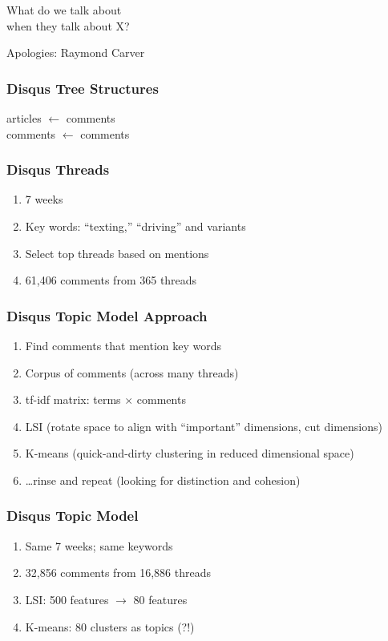 \documentclass{beamer}
\begin{document}
\begin{frame}
\begin{center}
{\Huge What do we talk about \\ [15pt] when they talk about X?} 
\end{center}
\hfill Apologies: Raymond Carver \\
\end{frame}

\begin{frame}\frametitle{Disqus Tree Structures}
\begin{center}
{\Huge articles $\leftarrow$ comments \\ [20 pt] comments $\leftarrow$ comments}
\end{center}
\end{frame}

\begin{frame}\frametitle{Disqus Threads}
\begin{center}
{\Large 
\begin{enumerate}
\item 7 weeks
\item Key words: ``texting,'' ``driving'' and variants
\item Select top threads based on mentions
\item 61,406 comments from 365 threads
\end{enumerate}
}
\end{center}
\end{frame}

\begin{frame}\frametitle{Disqus Topic Model Approach}
\begin{center}
{\Large 
\begin{enumerate}
\item Find comments that mention key words
\item Corpus of comments (across many threads)
\item tf-idf matrix: terms $\times$ comments
\item LSI (rotate space to align with ``important'' dimensions, cut dimensions)
\item K-means (quick-and-dirty clustering in reduced dimensional space)
\item \ldots rinse and repeat (looking for distinction and cohesion)
\end{enumerate}
}
\end{center}
\end{frame}

\begin{frame}\frametitle{Disqus Topic Model}
\begin{center}
{\Large 
\begin{enumerate}
\item Same 7 weeks; same keywords
\item 32,856 comments from 16,886 threads
\item LSI: 500 features $\rightarrow$ 80 features
\item K-means: 80 clusters as topics (?!)
\end{enumerate}
}
\end{center}
\end{frame}
\end{document}
